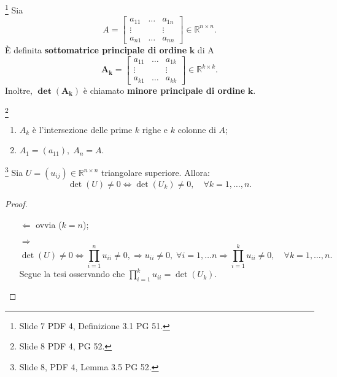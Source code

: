 \begin{definition}\footnote{Slide 7 PDF 4, Definizione 3.1 PG 51.}
    Sia
    \begin{equation}
        A=
        \begin{bmatrix}
            a_{11} & \hdots & a_{1n}\\
            \vdots & & \vdots\\
            a_{n1} & \hdots & a_{nn}
        \end{bmatrix}\in\mathbb R^{n\times n}.
    \end{equation}
    È definita \textbf{sottomatrice principale di ordine} $\boldsymbol k$ di A
    \begin{equation}
        \boldsymbol{A_k=}
        \begin{bmatrix}
            a_{11} & \hdots & a_{1k}\\
            \vdots & & \vdots\\
            a_{k1} & \hdots & a_{kk}
        \end{bmatrix}\in\mathbb R^{k\times k}.
    \end{equation}
    Inoltre, $\boldsymbol{\det(A_k)}$ è chiamato \textbf{minore principale di ordine} $\boldsymbol k$.
\end{definition}

\begin{remark}
    \footnote{Slide 8 PDF 4, PG 52.}
    \begin{enumerate}
        \item $A_k$ è l'intersezione delle prime $k$ righe e $k$ colonne di $A$;
        \item $A_1=(a_{11}),\; A_n=A.$
    \end{enumerate}
\end{remark}

\begin{lemma}
    \footnote{Slide 8, PDF 4, Lemma 3.5 PG 52.}
    Sia $U=(u_{ij})\in\mathbb R^{n\times n}$ triangolare superiore. Allora:
    \begin{equation*}
        \det(U)\neq 0\iff \det(U_k)\neq 0,\quad \forall k=1,\hdots, n.
    \end{equation*}
\end{lemma}
\begin{proof}
    \begin{itemize}
        \item [$\Leftarrow$] ovvia ($k=n$);
        \item [$\Rightarrow$]
        \begin{equation*}
             \det(U)\neq 0 \iff \prod_{i=1}^nu_{ii}\neq 0,\Rightarrow u_{ii}\neq 0,\; \forall i=1,\hdots n \Rightarrow \prod_{i=1}^k u_{ii}\neq 0,\quad \forall k=1,\hdots, n.
        \end{equation*}
        Segue la tesi osservando che $\prod_{i=1}^k u_{ii}=\det(U_k).$
    \end{itemize}
\end{proof}

